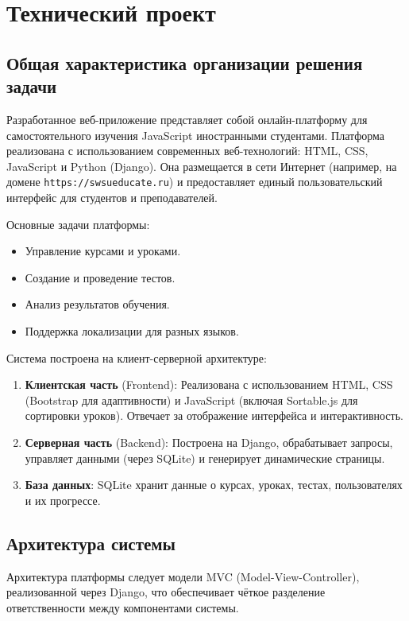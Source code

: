 \section{Технический проект}

\subsection{Общая характеристика организации решения задачи}

Разработанное веб-приложение представляет собой онлайн-платформу для самостоятельного изучения JavaScript иностранными студентами. Платформа реализована с использованием современных веб-технологий: HTML, CSS, JavaScript и Python (Django). Она размещается в сети Интернет (например, на домене \texttt{https://swsueducate.ru}) и предоставляет единый пользовательский интерфейс для студентов и преподавателей.

Основные задачи платформы:
\begin{itemize}
	\item Управление курсами и уроками.
	\item Создание и проведение тестов.
	\item Анализ результатов обучения.
	\item Поддержка локализации для разных языков.
\end{itemize}

Система построена на клиент-серверной архитектуре:
\begin{enumerate}
	\item \textbf{Клиентская часть} (Frontend): Реализована с использованием HTML, CSS (Bootstrap для адаптивности) и JavaScript (включая Sortable.js для сортировки уроков). Отвечает за отображение интерфейса и интерактивность.
	\item \textbf{Серверная часть} (Backend): Построена на Django, обрабатывает запросы, управляет данными (через SQLite) и генерирует динамические страницы.
	\item \textbf{База данных}: SQLite хранит данные о курсах, уроках, тестах, пользователях и их прогрессе.
\end{enumerate}

\subsection{Архитектура системы}

Архитектура платформы следует модели MVC (Model-View-Controller), реализованной через Django, что обеспечивает чёткое разделение ответственности между компонентами системы.

